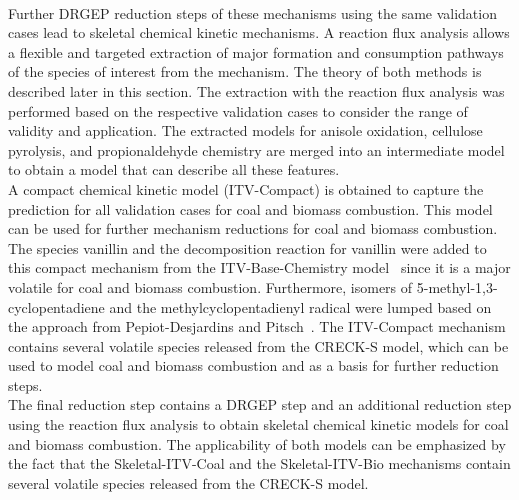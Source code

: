 \begin{refsection}
\begin{figure}[h]
  \label{fig:B1bKineticModelDevelopmentStructure}
\end{figure}
\\
Further DRGEP reduction steps of these mechanisms using the same validation cases lead to skeletal chemical kinetic mechanisms. A reaction flux analysis allows a flexible and targeted extraction of major formation and consumption pathways of the species of interest from the mechanism. The theory of both methods is described later in this section. The extraction with the reaction flux analysis was performed based on the respective validation cases to consider the range of validity and application. The extracted models for anisole oxidation, cellulose pyrolysis, and propionaldehyde chemistry are merged into an intermediate model to obtain a model that can describe all these features.
\\
A compact chemical kinetic model (ITV-Compact) is obtained to capture the prediction for all validation cases for coal and biomass combustion. This model can be used for further mechanism reductions for coal and biomass combustion. The species vanillin and the decomposition reaction for vanillin were added to this compact mechanism from the ITV-Base-Chemistry model~\cite{Langer2023} since it is a major volatile for coal and biomass combustion. Furthermore, isomers of 5-methyl-1,3-cyclopentadiene and the methylcyclopentadienyl radical were lumped based on the approach from Pepiot-Desjardins and Pitsch~\cite{PepiotDesjardins2008b}. The ITV-Compact mechanism contains several volatile species released from the CRECK-S model, which can be used to model coal and biomass combustion and as a basis for further reduction steps.
\\
The final reduction step contains a DRGEP step and an additional reduction step using the reaction flux analysis to obtain skeletal chemical kinetic models for coal and biomass combustion. The applicability of both models can be emphasized by the fact that the Skeletal-ITV-Coal and the Skeletal-ITV-Bio mechanisms contain several volatile species released from the CRECK-S model.

 

\end{refsection}
